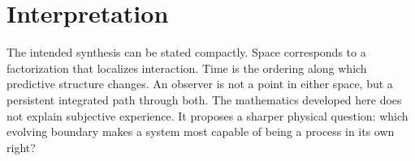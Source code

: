 \documentclass[11pt]{article}
\begin{document}
\section{Interpretation}

The intended synthesis can be stated compactly. Space corresponds to a
factorization that localizes interaction. Time is the ordering along which
predictive structure changes. An observer is not a point in either space, but a
persistent integrated path through both. The mathematics developed here does
not explain subjective experience. It proposes a sharper physical question:
which evolving boundary makes a system most capable of being a process in its
own right?



\end{document}
